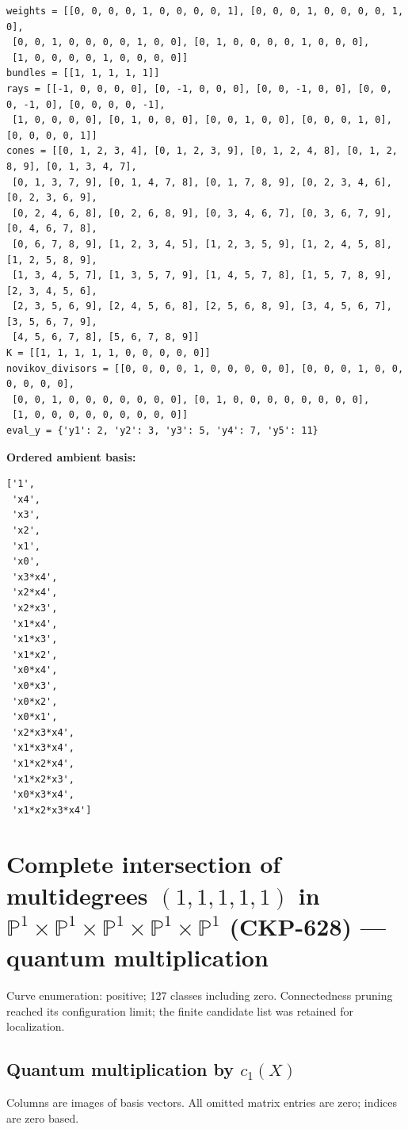 \documentclass[10pt,a4paper]{article}
\begin{document}
\begin{lstlisting}
weights = [[0, 0, 0, 0, 1, 0, 0, 0, 0, 1], [0, 0, 0, 1, 0, 0, 0, 0, 1, 0],
 [0, 0, 1, 0, 0, 0, 0, 1, 0, 0], [0, 1, 0, 0, 0, 0, 1, 0, 0, 0],
 [1, 0, 0, 0, 0, 1, 0, 0, 0, 0]]
bundles = [[1, 1, 1, 1, 1]]
rays = [[-1, 0, 0, 0, 0], [0, -1, 0, 0, 0], [0, 0, -1, 0, 0], [0, 0, 0, -1, 0], [0, 0, 0, 0, -1],
 [1, 0, 0, 0, 0], [0, 1, 0, 0, 0], [0, 0, 1, 0, 0], [0, 0, 0, 1, 0], [0, 0, 0, 0, 1]]
cones = [[0, 1, 2, 3, 4], [0, 1, 2, 3, 9], [0, 1, 2, 4, 8], [0, 1, 2, 8, 9], [0, 1, 3, 4, 7],
 [0, 1, 3, 7, 9], [0, 1, 4, 7, 8], [0, 1, 7, 8, 9], [0, 2, 3, 4, 6], [0, 2, 3, 6, 9],
 [0, 2, 4, 6, 8], [0, 2, 6, 8, 9], [0, 3, 4, 6, 7], [0, 3, 6, 7, 9], [0, 4, 6, 7, 8],
 [0, 6, 7, 8, 9], [1, 2, 3, 4, 5], [1, 2, 3, 5, 9], [1, 2, 4, 5, 8], [1, 2, 5, 8, 9],
 [1, 3, 4, 5, 7], [1, 3, 5, 7, 9], [1, 4, 5, 7, 8], [1, 5, 7, 8, 9], [2, 3, 4, 5, 6],
 [2, 3, 5, 6, 9], [2, 4, 5, 6, 8], [2, 5, 6, 8, 9], [3, 4, 5, 6, 7], [3, 5, 6, 7, 9],
 [4, 5, 6, 7, 8], [5, 6, 7, 8, 9]]
K = [[1, 1, 1, 1, 1, 0, 0, 0, 0, 0]]
novikov_divisors = [[0, 0, 0, 0, 1, 0, 0, 0, 0, 0], [0, 0, 0, 1, 0, 0, 0, 0, 0, 0],
 [0, 0, 1, 0, 0, 0, 0, 0, 0, 0], [0, 1, 0, 0, 0, 0, 0, 0, 0, 0],
 [1, 0, 0, 0, 0, 0, 0, 0, 0, 0]]
eval_y = {'y1': 2, 'y2': 3, 'y3': 5, 'y4': 7, 'y5': 11}
\end{lstlisting}

\textbf{Ordered ambient basis:}
\begin{lstlisting}
['1',
 'x4',
 'x3',
 'x2',
 'x1',
 'x0',
 'x3*x4',
 'x2*x4',
 'x2*x3',
 'x1*x4',
 'x1*x3',
 'x1*x2',
 'x0*x4',
 'x0*x3',
 'x0*x2',
 'x0*x1',
 'x2*x3*x4',
 'x1*x3*x4',
 'x1*x2*x4',
 'x1*x2*x3',
 'x0*x3*x4',
 'x1*x2*x3*x4']
\end{lstlisting}

\clearpage\section*{Complete intersection of multidegrees $(1,1,1,1,1)$ in $\mathbb P^{1}\times \mathbb P^{1}\times \mathbb P^{1}\times \mathbb P^{1}\times \mathbb P^{1}$ (CKP-628) --- quantum multiplication}

Curve enumeration: positive; 127 classes including zero.
Connectedness pruning reached its configuration limit; the finite candidate list was retained for localization.
\subsection*{Quantum multiplication by $c_1(X)$}
Columns are images of basis vectors. All omitted matrix entries are zero; indices are zero based.
\end{document}
